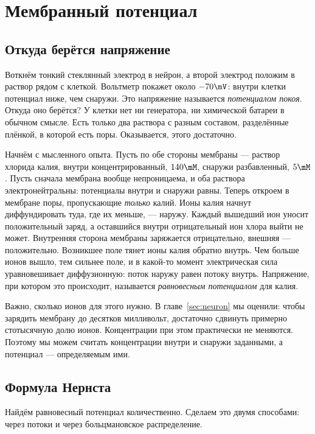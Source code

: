 \chapter{Мембранный потенциал}
\label{sec:membrane}

\section{Откуда берётся напряжение}

Воткнём тонкий стеклянный электрод в нейрон, а второй электрод положим в раствор рядом с клеткой. Вольтметр покажет около $-70\mV$: внутри клетки потенциал ниже, чем снаружи. Это напряжение называется \emph{потенциалом покоя}. Откуда оно берётся? У клетки нет ни генератора, ни химической батареи в обычном смысле. Есть только два раствора с разным составом, разделённые плёнкой, в которой есть поры. Оказывается, этого достаточно.

Начнём с мысленного опыта. Пусть по обе стороны мембраны --- раствор хлорида калия, внутри концентрированный, $140\mM$, снаружи разбавленный, $5\mM$. Пусть сначала мембрана вообще непроницаема, и оба раствора электронейтральны: потенциалы внутри и снаружи равны. Теперь откроем в мембране поры, пропускающие \emph{только} калий. Ионы калия начнут диффундировать туда, где их меньше, --- наружу. Каждый вышедший ион уносит положительный заряд, а оставшийся внутри отрицательный ион хлора выйти не может. Внутренняя сторона мембраны заряжается отрицательно, внешняя --- положительно. Возникшее поле тянет ионы калия обратно внутрь. Чем больше ионов вышло, тем сильнее поле, и в какой-то момент электрическая сила уравновешивает диффузионную: поток наружу равен потоку внутрь. Напряжение, при котором это происходит, называется \emph{равновесным потенциалом} для калия.

Важно, сколько ионов для этого нужно. В главе~\ref{sec:neuron} мы оценили: чтобы зарядить мембрану до десятков милливольт, достаточно сдвинуть примерно стотысячную долю ионов. Концентрации при этом практически не меняются. Поэтому мы можем считать концентрации внутри и снаружи заданными, а потенциал --- определяемым ими.

\section{Формула Нернста}

Найдём равновесный потенциал количественно. Сделаем это двумя способами: через потоки и через больцмановское распределение.

